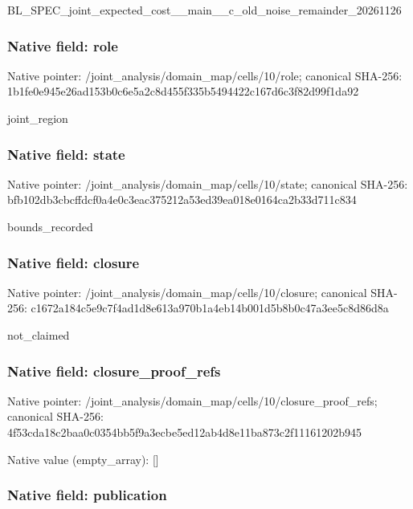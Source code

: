 \documentclass[10pt,a4paper]{article}
\begin{document}
BL\_SPEC\_joint\_expected\_c\allowbreak{}ost\_\_main\_\_c\_old\_noise\_r\allowbreak{}emainder\_20261126


\subsubsection{Native field: role}


Native pointer: /joint\_analysis/domain\_m\allowbreak{}ap/cells/10/role; canonical SHA-256: 1b1fe0e945e26ad153b0c6e5\allowbreak{}a2c8d455f335b5494422c167\allowbreak{}d6c3f82d99f1da92


joint\_region


\subsubsection{Native field: state}


Native pointer: /joint\_analysis/domain\_m\allowbreak{}ap/cells/10/state; canonical SHA-256: bfb102db3cbcffdcf0a4e0c3\allowbreak{}eac375212a53ed39ea018e01\allowbreak{}64ca2b33d711c834


bounds\_recorded


\subsubsection{Native field: closure}


Native pointer: /joint\_analysis/domain\_m\allowbreak{}ap/cells/10/closure; canonical SHA-256: c1672a184c5e9c7f4ad1d8e6\allowbreak{}13a970b1a4eb14b001d5b8b0\allowbreak{}c47a3ee5c8d86d8a


not\_claimed


\subsubsection{Native field: closure\_proof\_refs}


Native pointer: /joint\_analysis/domain\_m\allowbreak{}ap/cells/10/closure\_proo\allowbreak{}f\_refs; canonical SHA-256: 4f53cda18c2baa0c0354bb5f\allowbreak{}9a3ecbe5ed12ab4d8e11ba87\allowbreak{}3c2f11161202b945



Native value (empty\_array): []



\subsubsection{Native field: publication}
\end{document}
